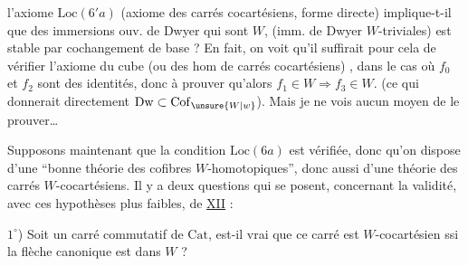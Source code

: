 

l'axiome $\mathrm{Loc}(6'a)$ (axiome des carrés cocartésiens, forme directe) implique-t-il que  des immersions ouv. de Dwyer qui sont  $W$,  (imm. de Dwyer $W$-triviales) est stable par cochangement de base ?
En fait, on voit qu'il suffirait pour cela de vérifier l'axiome du cube (ou des hom de carrés cocartésiens) , dans le cas où $f_0$ et $f_2$ sont des identités, donc à prouver qu'alors $f_1\in W\Longrightarrow f_3\in W$. (ce qui donnerait directement $\mathrm{Dw}\subset\mathrm{Cof}_{\unsure{W|w}}$). Mais je ne vois aucun moyen de le prouver\ldots

Supposons maintenant que la condition $\mathrm{Loc}(6a)$ est vérifiée, donc qu'on dispose d'une ``bonne théorie des cofibres $W$-homotopiques'', donc aussi d'une théorie des carrés $W$-cocartésiens. Il y a deux questions qui se posent, concernant la validité, avec ces hypothèses plus faibles,  de \uline{XII} :

$1^\circ$) Soit un carré commutatif
de $\mathrm{Cat}$, est-il vrai que ce carré est $W$-cocartésien ssi la flèche canonique
est dans $W$ ?
